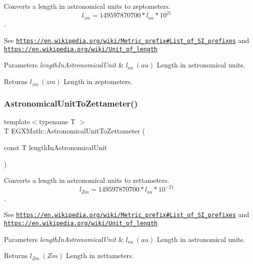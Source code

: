 Converts a length in astronomical units to zeptometers. \[ l_{zm}=149597870700 * l_{au} * 10^{21} \]. 

See \href{https://en.wikipedia.org/wiki/Metric_prefix#List_of_SI_prefixes}{\tt https\+://en.\+wikipedia.\+org/wiki/\+Metric\+\_\+prefix\#\+List\+\_\+of\+\_\+\+S\+I\+\_\+prefixes} and \href{https://en.wikipedia.org/wiki/Unit_of_length}{\tt https\+://en.\+wikipedia.\+org/wiki/\+Unit\+\_\+of\+\_\+length} 
\begin{DoxyParams}{Parameters}
{\em length\+In\+Astronomical\+Unit} & $ l_{au}\ (au)$ Length in astronomical units. \\
\hline
\end{DoxyParams}
\begin{DoxyReturn}{Returns}
$ l_{zm}\ (zm)$ Length in zeptometers. 
\end{DoxyReturn}
\mbox{\label{group___e_g_x_math-_conversions-_length_conversions-_astronomical-_astronomical_unit-_s_i_ga7fcac45015ba20b9dd52b328ddb29ed9}} 
\subsubsection{\texorpdfstring{Astronomical\+Unit\+To\+Zettameter()}{AstronomicalUnitToZettameter()}}
{\footnotesize\ttfamily template$<$typename T $>$ \\
T E\+G\+X\+Math\+::\+Astronomical\+Unit\+To\+Zettameter (\begin{DoxyParamCaption}\item[{const T}]{length\+In\+Astronomical\+Unit }\end{DoxyParamCaption})}



Converts a length in astronomical units to zettameters. \[ l_{Zm}=149597870700 * l_{au} * 10^{-21} \]. 

See \href{https://en.wikipedia.org/wiki/Metric_prefix#List_of_SI_prefixes}{\tt https\+://en.\+wikipedia.\+org/wiki/\+Metric\+\_\+prefix\#\+List\+\_\+of\+\_\+\+S\+I\+\_\+prefixes} and \href{https://en.wikipedia.org/wiki/Unit_of_length}{\tt https\+://en.\+wikipedia.\+org/wiki/\+Unit\+\_\+of\+\_\+length} 
\begin{DoxyParams}{Parameters}
{\em length\+In\+Astronomical\+Unit} & $ l_{au}\ (au)$ Length in astronomical units. \\
\hline
\end{DoxyParams}
\begin{DoxyReturn}{Returns}
$ l_{Zm}\ (Zm)$ Length in zettameters. 
\end{DoxyReturn}
